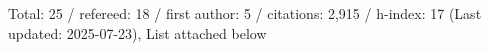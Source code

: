 Total: 25 / refereed: 18 / first author: 5 / citations: 2,915 / h-index: 17 (Last updated: 2025-07-23), List attached below
